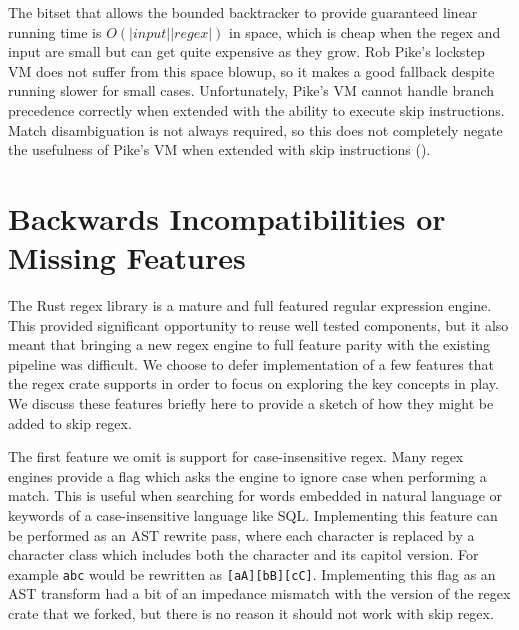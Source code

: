 The bitset that allows the bounded backtracker to provide guaranteed
linear running time is $O(|input||regex|)$ in space, which is
cheap when the regex and input are small but can get quite expensive
as they grow. Rob Pike's lockstep VM does not suffer from this
space blowup, so it makes a good fallback despite running slower
for small cases. Unfortunately, Pike's VM cannot handle branch
precedence correctly when extended with the ability to execute
skip instructions. Match disambiguation is not always required,
so this does not completely negate the usefulness of Pike's VM
when extended with skip instructions (\cite{Pike1987}).

\section{Backwards Incompatibilities or Missing Features}

The Rust regex library is a mature and full featured regular expression
engine. This provided significant opportunity to reuse well tested
components, but it also meant that bringing a new regex engine to
full feature parity with the existing pipeline was difficult. We
choose to defer implementation of a few features that the regex crate
supports in order to focus on exploring the key concepts in play.
We discuss these features briefly here to provide a sketch of how
they might be added to skip regex.

The first feature we omit is support for case-insensitive regex.
Many regex engines provide a flag which asks the engine to ignore
case when performing a match. This is useful when searching for
words embedded in natural language or keywords of a case-insensitive
language like SQL. Implementing this feature can be performed as
an AST rewrite pass, where each character is replaced by a character
class which includes both the character and its capitol version.
For example \verb'abc' would be rewritten as \verb'[aA][bB][cC]'.
Implementing this flag as an AST transform had a bit of an
impedance mismatch with the version of the regex crate that we
forked, but there is no reason it should not work with skip regex.

